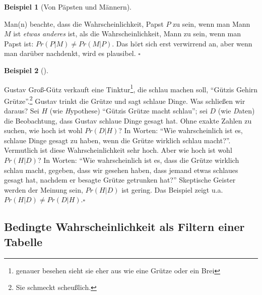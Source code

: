 \documentclass[
  ngerman,
  letterpaper,
  twoside,
  open=any]{scrbook}
\theoremstyle{definition}
\newtheorem{example}{Beispiel}[chapter]
\theoremstyle{plain}
\theoremstyle{definition}
\theoremstyle{definition}
\theoremstyle{remark}
\begin{document}
\begin{example}[Von Päpsten und
Männern]\protect\hypertarget{exm-papst}{}\label{exm-papst}

Man(n) beachte, dass die Wahrscheinlichkeit, Papst \(P\) zu sein, wenn
man Mann \(M\) ist \emph{etwas anderes} ist, als die Wahrscheinlichkeit,
Mann zu sein, wenn man Papst ist: \(Pr(P|M) \ne Pr(M|P)\). Das hört sich
erst verwirrend an, aber wenn man darüber nachdenkt, wird es plausibel.
\(\square\)

\end{example}

\begin{example}[]\protect\hypertarget{exm-hirn-grütze}{}\label{exm-hirn-grütze}

Gustav Groß-Gütz verkauft eine Tinktur\footnote{genauer besehen sieht
  sie eher aus wie eine Grütze oder ein Brei}, die schlau machen soll,
\enquote{Gützis Gehirn Grütze}.\footnote{Sie schmeckt scheußlich.}
Gustav trinkt die Grütze und sagt schlaue Dinge. Was schließen wir
daraus? Sei \(H\) (wie \emph{H}ypothese) \enquote{Gützis Grütze macht
schlau}; sei \(D\) (wie \emph{D}aten) die Beobachtung, dass Gustav
schlaue Dinge gesagt hat. Ohne exakte Zahlen zu suchen, wie hoch ist
wohl \(Pr(D|H)\)? In Worten: \enquote{Wie wahrscheinlich ist es, schlaue
Dinge gesagt zu haben, wenn die Grütze wirklich schlau macht?}.
Vermutlich ist diese Wahrscheinlichkeit sehr hoch. Aber wie hoch ist
wohl \(Pr(H|D)\)? In Worten: \enquote{Wie wahrscheinlich ist es, dass
die Grütze wirklich schlau macht, gegeben, dass wir gesehen haben, dass
jemand etwas schlaues gesagt hat, nachdem er besagte Grütze getrunken
hat?} Skeptische Geister werden der Meinung sein, \(Pr(H|D)\) ist
gering. Das Beispiel zeigt u.a. \(Pr(H|D) \ne Pr(D|H).\square\)

\end{example}

\subsection{Bedingte Wahrscheinlichkeit als Filtern einer
Tabelle}\label{bedingte-wahrscheinlichkeit-als-filtern-einer-tabelle}
\end{document}
